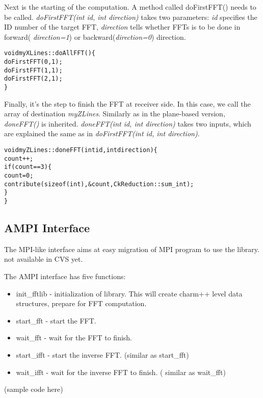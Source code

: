 Next is the starting of the computation. A method called doFirstFFT()
needs to be called. {\it doFirstFFT(int id, int direction)} takes two
parameters: {\it id} specifies the ID number of the target FFT, {\it
direction} tells whether FFTs is to be done in forward({\it
direction=1}) or backward({\it direction=0}) direction.
\begin{alltt}
    void myXLines::doAllFFT() \{
        doFirstFFT(0, 1);
        doFirstFFT(1, 1);
        doFirstFFT(2, 1);
    \}
\end{alltt}

Finally, it's the step to finish the FFT at receiver side. In this
case, we call the array of destination {\it myZLines}. Similarly as in
the plane-based version, {\it doneFFT()} is inherited.  {\it
doneFFT(int id, int direction)} takes two inputs, which are explained
the same as in {\it doFirstFFT(int id, int direction)}.
\begin{alltt}
    void myZLines::doneFFT(int id, int direction) \{
        count ++;
        if(count==3) \{
            count = 0;
            contribute(sizeof(int), &count, CkReduction::sum_int);
        \}
    \}
\end{alltt}

\subsection {AMPI Interface}
The MPI-like interface aims at easy migration of MPI program to
use the library. {not available in CVS yet.}

The AMPI interface has five functions:
\begin{itemize}
\item init\_fftlib - initialization of library. This will create
charm++ level data structures, prepare for FFT computation.
\item start\_fft - start the FFT. 
\item wait\_fft - wait for the FFT to finish. 
\item start\_ifft - start the inverse FFT. (similar as start\_fft)
\item wait\_ifft - wait for the inverse FFT to finish. ( similar as wait\_fft)
\end{itemize}

(sample code here)
\begin{alltt}
\end{alltt}

